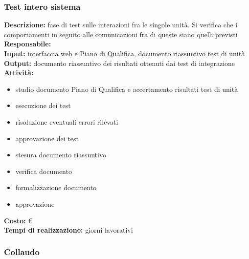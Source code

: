 \subsubsection{Test intero sistema}
\textbf{Descrizione:} fase di test sulle interazioni fra le singole unità. Si verifica che i comportamenti in seguito alle comunicazioni fra di queste siano quelli previsti \\
\linebreak
\textbf{Responsabile:} \\
\linebreak
\textbf{Input:} interfaccia web e Piano di Qualifica, documento riassuntivo test di unità \\
\linebreak
\textbf{Output:} documento riassuntivo dei risultati ottenuti dai test di integrazione \\
\linebreak
\textbf{Attività:}
\begin{itemize}
\item studio documento Piano di Qualifica e accertamento risultati test di unità
\item esecuzione dei test
\item risoluzione eventuali errori rilevati
\item approvazione dei test
\item stesura documento riassuntivo
\item verifica documento
\item formalizzazione documento
\item approvazione
\end{itemize}
\textbf{Costo:} \euro \\
\textbf{Tempi di realizzazione:}  giorni lavorativi





\subsubsection{Collaudo}

